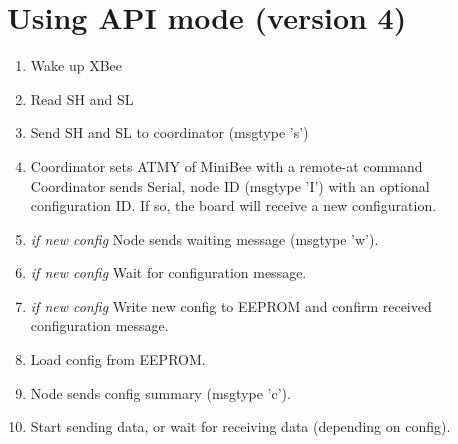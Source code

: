 \documentclass[letterpaper,10pt]{article}
\begin{document}

% 

\section{Using API mode (version 4)}

\begin{enumerate}
 \item Wake up XBee
 \item Read SH and SL
 \item Send SH and SL to coordinator (msgtype 's')
 \item Coordinator sets ATMY of MiniBee with a remote-at command\\
	Coordinator sends Serial, node ID (msgtype 'I') with an optional configuration ID. If so, the board will receive a new configuration.
 \item \textit{if new config} Node sends waiting message (msgtype 'w').
 \item \textit{if new config} Wait for configuration message.
 \item \textit{if new config} Write new config to EEPROM and confirm received configuration message.
 \item Load config from EEPROM.
 \item Node sends config summary (msgtype 'c').
 \item Start sending data, or wait for receiving data (depending on config).
\end{enumerate}
\end{document}
